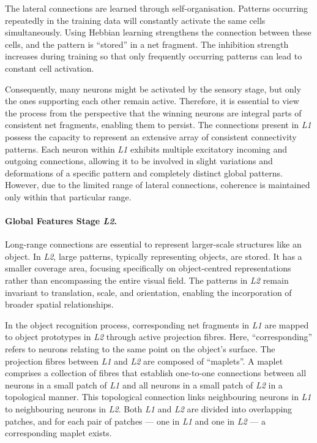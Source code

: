 The lateral connections are learned through self-organisation. Patterns occurring repeatedly in the training data will constantly activate the same cells simultaneously. Using Hebbian learning strengthens the connection between these cells, and the pattern is ``stored'' in a net fragment. The inhibition strength increases during training so that only frequently occurring patterns can lead to constant cell activation.

Consequently, many neurons might be activated by the sensory stage, but only the ones supporting each other remain active.
Therefore, it is essential to view the process from the perspective that the winning neurons are integral parts of consistent net fragments, enabling them to persist.
The connections present in \emph{L1} possess the capacity to represent an extensive array of consistent connectivity patterns. Each neuron within \emph{L1} exhibits multiple excitatory incoming and outgoing connections, allowing it to be involved in slight variations and deformations of a specific pattern and completely distinct global patterns. However, due to the limited range of lateral connections, coherence is maintained only within that particular range.

\paragraph{Global Features Stage \emph{L2}.} Long-range connections are essential to represent larger-scale structures like an object. In \emph{L2}, large patterns, typically representing objects, are stored. 
It has a smaller coverage area, focusing specifically on object-centred representations rather than encompassing the entire visual field.
The patterns in \emph{L2} remain invariant to translation, scale, and orientation, enabling the incorporation of broader spatial relationships.

In the object recognition process, corresponding net fragments in \emph{L1} are mapped to object prototypes in \emph{L2} through active projection fibres. Here, ``corresponding'' refers to neurons relating to the same point on the object's surface.
The projection fibres between \emph{L1} and \emph{L2} are composed of ``maplets''. A maplet comprises a collection of fibres that establish one-to-one connections between all neurons in a small patch of \emph{L1} and all neurons in a small patch of \emph{L2} in a topological manner. This topological connection links neighbouring neurons in \emph{L1} to neighbouring neurons in \emph{L2}. Both \emph{L1} and \emph{L2} are divided into overlapping patches, and for each pair of patches — one in \emph{L1} and one in \emph{L2} — a corresponding maplet exists.

